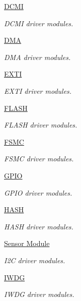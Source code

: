 \begin{DoxyCompactItemize}
\hyperlink{group___d_c_m_i}{D\-C\-M\-I}
\begin{DoxyCompactList}\small\item\em D\-C\-M\-I driver modules. \end{DoxyCompactList}\item 
\hyperlink{group___d_m_a}{D\-M\-A}
\begin{DoxyCompactList}\small\item\em D\-M\-A driver modules. \end{DoxyCompactList}\item 
\hyperlink{group___e_x_t_i}{E\-X\-T\-I}
\begin{DoxyCompactList}\small\item\em E\-X\-T\-I driver modules. \end{DoxyCompactList}\item 
\hyperlink{group___f_l_a_s_h}{F\-L\-A\-S\-H}
\begin{DoxyCompactList}\small\item\em F\-L\-A\-S\-H driver modules. \end{DoxyCompactList}\item 
\hyperlink{group___f_s_m_c}{F\-S\-M\-C}
\begin{DoxyCompactList}\small\item\em F\-S\-M\-C driver modules. \end{DoxyCompactList}\item 
\hyperlink{group___g_p_i_o}{G\-P\-I\-O}
\begin{DoxyCompactList}\small\item\em G\-P\-I\-O driver modules. \end{DoxyCompactList}\item 
\hyperlink{group___h_a_s_h}{H\-A\-S\-H}
\begin{DoxyCompactList}\small\item\em H\-A\-S\-H driver modules. \end{DoxyCompactList}\item 
\hyperlink{group___i2_c}{Sensor Module}
\begin{DoxyCompactList}\small\item\em I2\-C driver modules. \end{DoxyCompactList}\item 
\hyperlink{group___i_w_d_g}{I\-W\-D\-G}
\begin{DoxyCompactList}\small\item\em I\-W\-D\-G driver modules. \end{DoxyCompactList}\item 

\end{DoxyCompactItemize}
